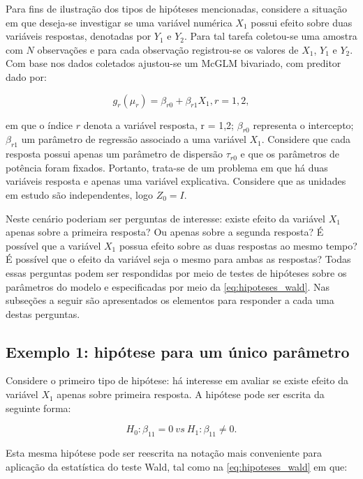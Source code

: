 Para fins de ilustração dos tipos de hipóteses mencionadas, considere a situação em que deseja-se investigar se uma variável numérica $X_1$ possui efeito sobre duas variáveis respostas, denotadas por $Y_1$ e $Y_2$. Para tal tarefa coletou-se uma amostra com $N$ observações e para cada observação registrou-se os valores de $X_1$, $Y_1$ e $Y_2$. Com base nos dados coletados ajustou-se um McGLM bivariado, com preditor dado por:

\begin{equation}
\label{eq:pred_ex}
g_r(\mu_r) = \beta_{r0} + \beta_{r1} X_1, r=1,2,
\end{equation}

\noindent em que o índice $r$ denota a variável resposta, r = 1,2; $\beta_{r0}$ representa o intercepto; $\beta_{r1}$ um parâmetro de regressão associado a uma variável $X_1$. Considere que cada resposta possui apenas um parâmetro de dispersão $\tau_{r0}$ e que os parâmetros de potência foram fixados. Portanto, trata-se de um problema em que há duas variáveis resposta e apenas uma variável explicativa. Considere que as unidades em estudo são independentes, logo $Z_0 = I$. 

Neste cenário poderiam ser perguntas de interesse: existe efeito da variável $X_1$ apenas sobre a primeira resposta? Ou apenas sobre a segunda resposta? É possível que a variável $X_1$ possua efeito sobre as duas respostas ao mesmo tempo? É possível que o efeito da variável seja o mesmo para ambas as respostas? Todas essas perguntas podem ser respondidas por meio de testes de hipóteses sobre os parâmetros do modelo e especificadas por meio da \autoref{eq:hipoteses_wald}. Nas subseções a seguir são apresentados os elementos para responder a cada uma destas perguntas. 

\subsection{Exemplo 1: hipótese para um único parâmetro}

Considere o primeiro tipo de hipótese: há interesse em avaliar se existe efeito da variável $X_1$ apenas sobre primeira resposta. A hipótese pode ser escrita da seguinte forma:

\begin{equation}
\label{eq:ex1}
H_0: \beta_{11} = 0 \ vs \ H_1: \beta_{11} \neq 0.
\end{equation}

Esta mesma hipótese pode ser reescrita na notação mais conveniente para aplicação da estatística do teste Wald, tal como na \autoref{eq:hipoteses_wald} em que:

